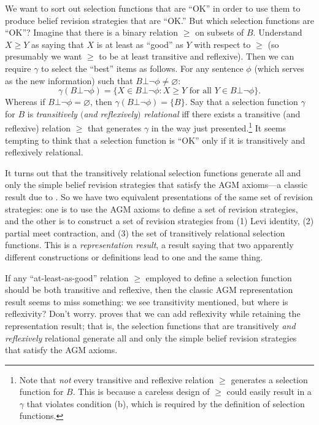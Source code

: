 We want to sort out selection functions that are  ``OK'' in order to use them to produce belief revision strategies that are ``OK.'' But which selection functions are ``OK''? Imagine that there is a binary relation $\ge$ on subsets of $B$. Understand $X \ge Y$ as saying that $X$ is at least as ``good'' as $Y$ with respect to $\ge$ (so presumably we want $\ge$ to be at least transitive and reflexive). Then we can require $\gamma$ to select the ``best'' items as follows. For any sentence $\phi$ (which serves as the new information) such that $B\bot\neg\phi \neq \varnothing$:
$$ \gamma(B\bot\neg\phi) = \{X \in B\bot\neg\phi : X \ge Y \mbox{ for all } Y \in B\bot\neg\phi \}.$$
Whereas if $B\bot\neg\phi = \varnothing$, then $\gamma(B\bot\neg\phi) = \{B\}$. Say that a selection function $\gamma$ for $B$ is {\em transitively $($and reflexively$)$ relational} iff there exists a transitive (and reflexive) relation $\ge$ that generates $\gamma$ in the way just presented.\footnote
	{Note that {\em not} every transitive and reflexive relation $\ge$ generates a selection function for $B$. This is because a careless design of $\ge$ could easily result in a $\gamma$ that violates condition (b), which is required by the definition of selection functions.}
It seems tempting to think that a selection function is ``OK'' only if it is transitively and reflexively relational.

It turns out that the transitively relational selection functions generate all and only the simple belief revision strategies that satisfy the AGM axioms---a classic result due to \citet*{alchourron1985logic}. So we have two equivalent presentations of the same set of revision strategies: one is to use the AGM axioms to define a set of revision strategies, and the other is to construct a set of revision strategies from (1) Levi identity, (2) partial meet contraction, and (3) the set of transitively relational selection functions. This is a {\em representation result}, a result saying that two apparently different constructions or definitions lead to one and the same thing. 

If any ``at-least-as-good'' relation $\ge$ employed to define a selection function should be both transitive and reflexive, then the classic AGM representation result seems to miss something: we see transitivity mentioned, but where is reflexivity? Don't worry. \citet{rott1993belief} proves that we can add reflexivity while retaining the representation result; that is, the selection functions that are transitively {\em and reflexively} relational generate all and only the simple belief revision strategies that satisfy the AGM axioms.



